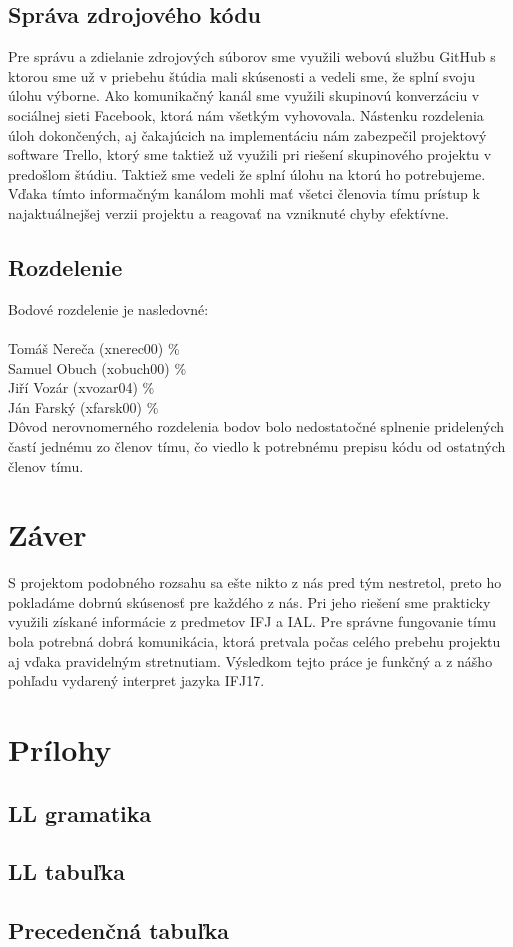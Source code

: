 \documentclass{article}
\begin{document}
        \subsection{Správa zdrojového kódu}
        Pre správu a zdielanie zdrojových súborov sme využili webovú službu GitHub s ktorou sme už 
        v priebehu štúdia mali skúsenosti a vedeli sme, že splní svoju úlohu výborne. Ako komunikačný
        kanál sme využili skupinovú konverzáciu v sociálnej sieti Facebook, ktorá nám všetkým vyhovovala.
        Nástenku rozdelenia úloh dokončených, aj čakajúcich na implementáciu nám zabezpečil projektový
        software Trello, ktorý sme taktiež už využili pri riešení skupinového projektu v predošlom
        štúdiu. Taktiež sme vedeli že splní úlohu na ktorú ho potrebujeme. Vďaka tímto informačným 
        kanálom mohli mať všetci členovia tímu prístup k najaktuálnejšej  verzii projektu a reagovať
        na vzniknuté chyby efektívne.

        \newpage
        \subsection{Rozdelenie}
        \noindent
        Bodové rozdelenie je nasledovné:\\ \\
        Tomáš Nereča (xnerec00) \% \\
        Samuel Obuch (xobuch00) \% \\
        Jiří Vozár (xvozar04) \% \\
        Ján Farský (xfarsk00) \% \\
        Dôvod nerovnomerného rozdelenia bodov bolo nedostatočné splnenie pridelených častí jednému 
        zo členov tímu, čo viedlo k potrebnému prepisu kódu od ostatných členov tímu.                                 

    \section{Záver}
    S projektom podobného rozsahu sa ešte nikto z nás pred tým nestretol, preto ho pokladáme dobrnú
    skúsenosť pre každého z nás. Pri jeho riešení sme prakticky využili získané informácie z 
    predmetov IFJ a IAL. Pre správne fungovanie tímu bola potrebná dobrá komunikácia, ktorá pretvala
    počas celého prebehu projektu aj vďaka pravidelným stretnutiam. Výsledkom tejto práce je funkčný
    a z nášho pohľadu vydarený interpret jazyka IFJ17.
    
    \section{Prílohy}
        \subsection{LL gramatika}
        \subsection{LL tabuľka}
        \subsection{Precedenčná tabuľka}
\end{document}
